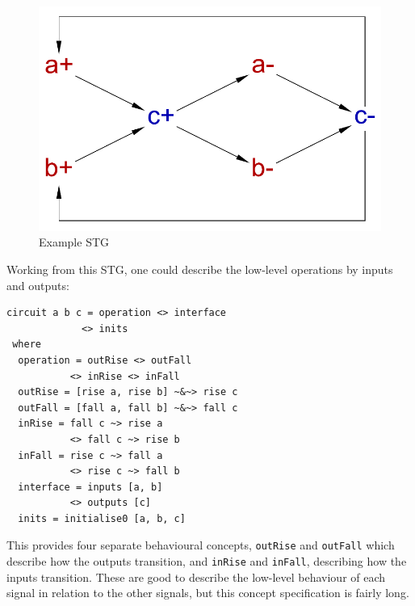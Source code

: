 \documentclass[british,conference,compsoc]{IEEEtran}
\begin{document}
\begin{figure}[h]
\vspace{-3mm}
\begin{centering}
\includegraphics[scale=0.3]{Images/cElement-stg.pdf}
\par\end{centering}
\protect\caption{\label{fig:cElement-stg} Example STG}
\vspace{-3mm}
\end{figure}

Working from this STG, one could describe the low-level operations by inputs and outputs:

\begin{verbatim}
circuit a b c = operation <> interface 
             <> inits
 where
  operation = outRise <> outFall 
           <> inRise <> inFall
  outRise = [rise a, rise b] ~&~> rise c
  outFall = [fall a, fall b] ~&~> fall c
  inRise = fall c ~> rise a 
           <> fall c ~> rise b
  inFall = rise c ~> fall a 
           <> rise c ~> fall b
  interface = inputs [a, b] 
           <> outputs [c]
  inits = initialise0 [a, b, c]
\end{verbatim}

\vspace{1mm}

\noindent This provides four separate behavioural concepts, \texttt{outRise} and \texttt{outFall}
which describe how the outputs transition, and
\texttt{inRise} and \texttt{inFall}, describing how the inputs transition. These are good
to describe the low-level behaviour of each signal in relation to the other signals, but this concept specification
is fairly long. 
\end{document}

